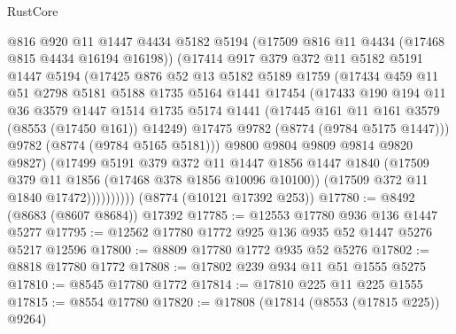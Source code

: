 \begin{lexlean}{RustCore}
\begin{coremodule}
                  @816
                  @920
                  @11
                  @1447
                  @4434
                  @5182
                  @5194
                  (@17509 @816 @11 @4434 (@17468 @815 @4434 @16194 @16198))
                  (@17414
                    @917
                    @379
                    @372
                    @11
                    @5182
                    @5191
                    @1447
                    @5194
                    (@17425
                      @876
                      @52
                      @13
                      @5182
                      @5189
                      @1759
                      (@17434
                        @459
                        @11
                        @51
                        @2798
                        @5181
                        @5188
                        @1735
                        @5164
                        @1441
                        @17454
                        (@17433
                          @190
                          @194
                          @11
                          @36
                          @3579
                          @1447
                          @1514
                          @1735
                          @5174
                          @1441
                          (@17445 @161 @11 @161 @3579 (@8553 (@17450 @161)) @14249)
                          @17475
                          @9782
                          (@8774 (@9784 @5175 @1447)))
                        @9782
                        (@8774 (@9784 @5165 @5181)))
                      @9800
                      @9804
                      @9809
                      @9814
                      @9820
                      @9827)
                    (@17499
                      @5191
                      @379
                      @372
                      @11
                      @1447
                      @1856
                      @1447
                      @1840
                      (@17509 @379 @11 @1856 (@17468 @378 @1856 @10096 @10100))
                      (@17509 @372 @11 @1840 @17472))))))))))
    (@8774 (@10121 @17392 @253))
@17780 := @8492 (@8683 (@8607 @8684)) @17392
@17785 := @12553 @17780 @936 @136 @1447 @5277
@17795 := @12562 @17780 @1772 @925 @136 @935 @52 @1447 @5276 @5217 @12596
@17800 := @8809 @17780 @1772 @935 @52 @5276
@17802 := @8818 @17780 @1772
@17808 := @17802 @239 @934 @11 @51 @1555 @5275
@17810 := @8545 @17780 @1772
@17814 := @17810 @225 @11 @225 @1555
@17815 := @8554 @17780
@17820 := @17808 (@17814 (@8553 (@17815 @225)) @9264)

\end{coremodule}
\end{lexlean}
